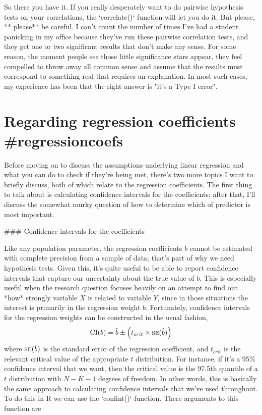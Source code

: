 So there you have it. If you really desperately want to do pairwise hypothesis tests on your correlations, the `correlate()` function will let you do it. But please, ** please** be careful. I can't count the number of times I've had a student panicking in my office because they've run these pairwise correlation tests, and they get one or two significant results that don't make any sense. For some reason, the moment people see those little significance stars appear, they feel compelled to throw away all common sense and assume that the results must correspond to something real that requires an explanation. In most such cases, my experience has been that the right answer is "it's a Type I error". 

\section{Regarding regression coefficients {#regressioncoefs}}

Before moving on to discuss the assumptions underlying linear regression and what you can do to check if they're being met, there's two more topics I want to briefly discuss, both of which relate to the regression coefficients. The first thing to talk about is calculating confidence intervals for the coefficients; after that, I'll discuss the somewhat murky question of how to determine which of predictor is most important.

### Confidence intervals for the coefficients

Like any population parameter, the regression coefficients $b$ cannot be estimated with complete precision from a sample of data; that's part of why we need hypothesis tests. Given this, it's quite useful to be able to report confidence intervals that capture our uncertainty about the true value of $b$. This is especially useful when the research question focuses heavily on an attempt to find out *how* strongly variable $X$ is related to variable $Y$, since in those situations the interest is primarily in the regression weight $b$. Fortunately, confidence intervals for the regression weights can be constructed in the usual fashion, 
$$
\mbox{CI}(b) = \hat{b} \pm \left( t_{crit} \times \mbox{\textsc{se}}(\hat{b})  \right)
$$
where $\mbox{\textsc{se}}(\hat{b})$ is the standard error of the regression coefficient, and $t_{crit}$ is the relevant critical value of the appropriate $t$ distribution. For instance, if it's a 95\% confidence interval that we want, then the critical value is the 97.5th quantile of a $t$ distribution with $N-K-1$ degrees of freedom.  In other words, this is basically the same approach to calculating confidence intervals that we've used throughout. To do this in R we can use the `confint()` function. There arguments to this function are

